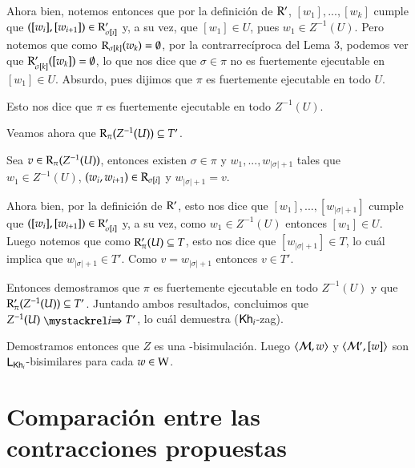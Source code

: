 \begin{demostracion}
\begin{itemize}
        Ahora bien, notemos entonces que por la definición de $\mathrm{R}'$, $[w_1],...,[w_k]$ cumple que $([w_i],[w_{i+1}]) \in \mathrm{R}'_{\sigma[i]}$ y, a su vez, que $[w_1] \in U$, pues $w_1 \in Z^{-1}(U)$. Pero notemos que como $\mathrm{R}_{\sigma[k]}(w_k) = \emptyset$, por la contrarrecíproca del Lema 3, podemos ver que $\mathrm{R}'_{\sigma[k]}([w_k]) = \emptyset$, lo que nos dice que $\sigma \in \pi$ no es fuertemente ejecutable en $[w_1] \in U$. Absurdo, pues dijimos que $\pi$ es fuertemente ejecutable en todo $U$.

        Esto nos dice que $\pi$ es fuertemente ejecutable en todo $Z^{-1}(U)$.

        Veamos ahora que $\mathrm{R}_\pi(Z^{-1}(U)) \subseteq T'$.

        Sea $v \in \mathrm{R}_\pi(Z^{-1}(U))$, entonces existen $\sigma \in \pi$ y $w_1,...,w_{|\sigma|+1}$ tales que $w_1 \in Z^{-1}(U)$, $(w_i,w_{i+1}) \in \mathrm{R}_{\sigma[i]}$ y $w_{|\sigma|+1} = v$. 

        Ahora bien, por la definición de $\mathrm{R}'$, esto nos dice que $[w_1],...,[w_{|\sigma|+1}]$ cumple que $([w_i],[w_{i+1}]) \in \mathrm{R}'_{\sigma[i]}$ y, a su vez, como $w_1 \in Z^{-1}(U)$ entonces $[w_1] \in U$. Luego notemos que como $\mathrm{R}'_\pi(U) \subseteq T$, esto nos dice que $[w_{|\sigma|+1}] \in T$, lo cuál implica que $w_{|\sigma|+1} \in T'$. Como $v = w_{|\sigma|+1}$ entonces $v \in T'$. 

        Entonces demostramos que $\pi$ es fuertemente ejecutable en todo $Z^{-1}(U)$ y que $\mathrm{R}'_\pi(Z^{-1}(U)) \subseteq T'$. Juntando ambos resultados, concluimos que $Z^{-1}(U) \ultsExecAgi T'$, lo cuál demuestra ($\mathsf{Kh}_i$-zag).
    \end{itemize}

    Demostramos entonces que $Z$ es una \KHilogic-bisimulación. Luego $\langle \mathcal{M},w \rangle$ y $\langle \mathcal{M}',[w] \rangle$ son $\mathsf{L}_{\mathsf{Kh}_i}$-bisimilares para cada $w \in \mathrm{W}$.
    
\end{demostracion}

\section{Comparación entre las contracciones propuestas}